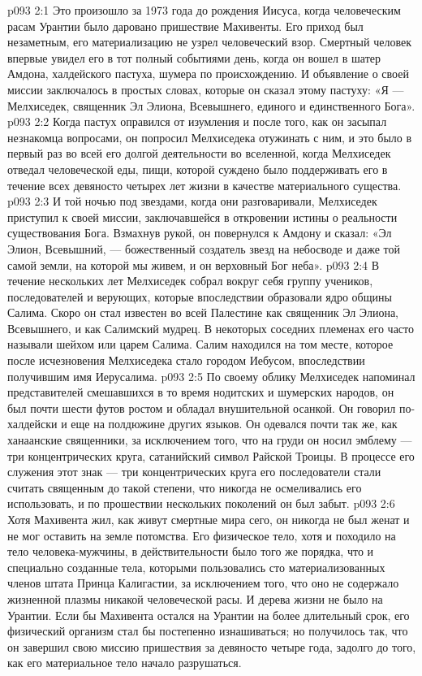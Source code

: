 \vs p093 2:1 Это произошло за 1973 года до рождения Иисуса, когда человеческим расам Урантии было даровано пришествие Махивенты. Его приход был незаметным, его материализацию не узрел человеческий взор. Смертный человек впервые увидел его в тот полный событиями день, когда он вошел в шатер Амдона, халдейского пастуха, шумера по происхождению. И объявление о своей миссии заключалось в простых словах, которые он сказал этому пастуху: «Я --- Мелхиседек, священник Эл Элиона, Всевышнего, единого и единственного Бога».
\vs p093 2:2 Когда пастух оправился от изумления и после того, как он засыпал незнакомца вопросами, он попросил Мелхиседека отужинать с ним, и это было в первый раз во всей его долгой деятельности во вселенной, когда Мелхиседек отведал человеческой еды, пищи, которой суждено было поддерживать его в течение всех девяносто четырех лет жизни в качестве материального существа.
\vs p093 2:3 И той ночью под звездами, когда они разговаривали, Мелхиседек приступил к своей миссии, заключавшейся в откровении истины о реальности существования Бога. Взмахнув рукой, он повернулся к Амдону и сказал: «Эл Элион, Всевышний, --- божественный создатель звезд на небосводе и даже той самой земли, на которой мы живем, и он верховный Бог неба».
\vs p093 2:4 \pc В течение нескольких лет Мелхиседек собрал вокруг себя группу учеников, последователей и верующих, которые впоследствии образовали ядро общины Салима. Скоро он стал известен во всей Палестине как священник Эл Элиона, Всевышнего, и как Салимский мудрец. В некоторых соседних племенах его часто называли шейхом или царем Салима. Салим находился на том месте, которое после исчезновения Мелхиседека стало городом Иебусом, впоследствии получившим имя Иерусалима.
\vs p093 2:5 \pc По своему облику Мелхиседек напоминал представителей смешавшихся в то время нодитских и шумерских народов, он был почти шести футов ростом и обладал внушительной осанкой. Он говорил по\hyp{}халдейски и еще на полдюжине других языков. Он одевался почти так же, как ханаанские священники, за исключением того, что на груди он носил эмблему --- три концентрических круга, сатанийский символ Райской Троицы. В процессе его служения этот знак --- три концентрических круга его последователи стали считать священным до такой степени, что никогда не осмеливались его использовать, и по прошествии нескольких поколений он был забыт.
\vs p093 2:6 Хотя Махивента жил, как живут смертные мира сего, он никогда не был женат и не мог оставить на земле потомства. Его физическое тело, хотя и походило на тело человека\hyp{}мужчины, в действительности было того же порядка, что и специально созданные тела, которыми пользовались сто материализованных членов штата Принца Калигастии, за исключением того, что оно не содержало жизненной плазмы никакой человеческой расы. И дерева жизни не было на Урантии. Если бы Махивента остался на Урантии на более длительный срок, его физический организм стал бы постепенно изнашиваться; но получилось так, что он завершил свою миссию пришествия за девяносто четыре года, задолго до того, как его материальное тело начало разрушаться.
